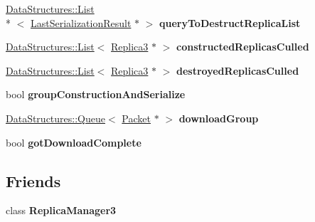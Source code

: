 \begin{DoxyCompactItemize}
\item 
\hypertarget{class_rak_net_1_1_connection___r_m3_a1da941fd05c4a81e221761502113b1e1}{\hyperlink{class_data_structures_1_1_list}{Data\-Structures\-::\-List}\\*
$<$ \hyperlink{struct_rak_net_1_1_last_serialization_result}{Last\-Serialization\-Result} $\ast$ $>$ {\bfseries query\-To\-Destruct\-Replica\-List}}\label{class_rak_net_1_1_connection___r_m3_a1da941fd05c4a81e221761502113b1e1}

\item 
\hypertarget{class_rak_net_1_1_connection___r_m3_a61a319882bf09eea1b5b7926c08d961a}{\hyperlink{class_data_structures_1_1_list}{Data\-Structures\-::\-List}$<$ \hyperlink{class_rak_net_1_1_replica3}{Replica3} $\ast$ $>$ {\bfseries constructed\-Replicas\-Culled}}\label{class_rak_net_1_1_connection___r_m3_a61a319882bf09eea1b5b7926c08d961a}

\item 
\hypertarget{class_rak_net_1_1_connection___r_m3_aee9c6599a53bbb0b81a3a63e1a5baab7}{\hyperlink{class_data_structures_1_1_list}{Data\-Structures\-::\-List}$<$ \hyperlink{class_rak_net_1_1_replica3}{Replica3} $\ast$ $>$ {\bfseries destroyed\-Replicas\-Culled}}\label{class_rak_net_1_1_connection___r_m3_aee9c6599a53bbb0b81a3a63e1a5baab7}

\item 
\hypertarget{class_rak_net_1_1_connection___r_m3_ac706675f51ba037e77f606d418f32a1a}{bool {\bfseries group\-Construction\-And\-Serialize}}\label{class_rak_net_1_1_connection___r_m3_ac706675f51ba037e77f606d418f32a1a}

\item 
\hypertarget{class_rak_net_1_1_connection___r_m3_a5483384702944da199cdef76804ed2d7}{\hyperlink{class_data_structures_1_1_queue}{Data\-Structures\-::\-Queue}$<$ \hyperlink{struct_rak_net_1_1_packet}{Packet} $\ast$ $>$ {\bfseries download\-Group}}\label{class_rak_net_1_1_connection___r_m3_a5483384702944da199cdef76804ed2d7}

\item 
\hypertarget{class_rak_net_1_1_connection___r_m3_aa7b2f726f6f8fb1b4b5863fcf56cce94}{bool {\bfseries got\-Download\-Complete}}\label{class_rak_net_1_1_connection___r_m3_aa7b2f726f6f8fb1b4b5863fcf56cce94}

\end{DoxyCompactItemize}
\subsection*{Friends}
\begin{DoxyCompactItemize}
\item 
\hypertarget{class_rak_net_1_1_connection___r_m3_a2c41ce50327f215dd6eb14fa9a3f7eeb}{class {\bfseries Replica\-Manager3}}\label{class_rak_net_1_1_connection___r_m3_a2c41ce50327f215dd6eb14fa9a3f7eeb}

\end{DoxyCompactItemize}


